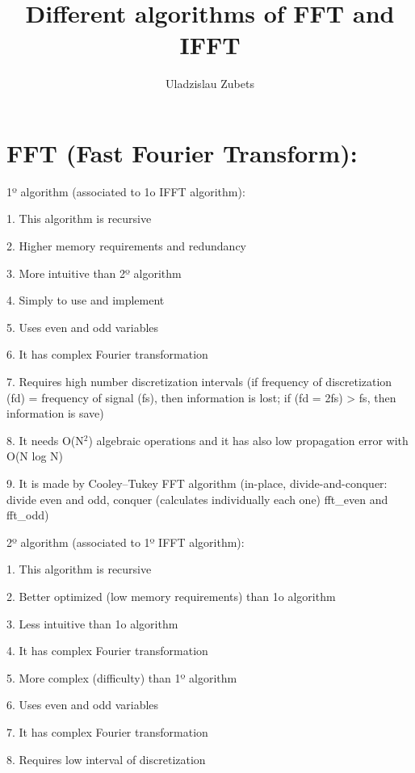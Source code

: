 \documentclass[12pt,a4paper,openany]{article}
\title{Different algorithms of FFT and IFFT}
\author{Uladzislau Zubets}
\begin{document}
\maketitle
\thispagestyle{empty}
\pagebreak
\tableofcontents
\listoffigures
\thispagestyle{empty}
\pagebreak
\setcounter{page}{1}

\section{FFT (Fast Fourier Transform):}

\hspace{1cm}
1º algorithm (associated to 1o IFFT algorithm):


1.	This algorithm is recursive


2.	Higher memory requirements and redundancy


3.	More intuitive than 2º algorithm


4.	Simply to use and implement


5.	Uses even and odd variables


6.	It has complex Fourier transformation


7.	Requires high number discretization intervals (if frequency of discretization (fd) = frequency of signal (fs), then information is lost; if (fd = 2fs) > fs, then information is save)


8.	It needs O(N$^{2}$) algebraic operations and it has also low propagation error with O(N log N)


9.	It is made by Cooley–Tukey FFT algorithm (in-place, divide-and-conquer: divide even and odd, conquer (calculates individually each one) fft_even and fft_odd)


2º algorithm (associated to 1º IFFT algorithm):


1.	This algorithm is recursive


2.	Better optimized (low memory requirements) than 1o algorithm


3.	Less intuitive than 1o algorithm


4.	It has complex Fourier transformation


5.	More complex (difficulty) than 1º algorithm


6.	Uses even and odd variables


7.	It has complex Fourier transformation


8.	Requires low interval of discretization
\end{document}
